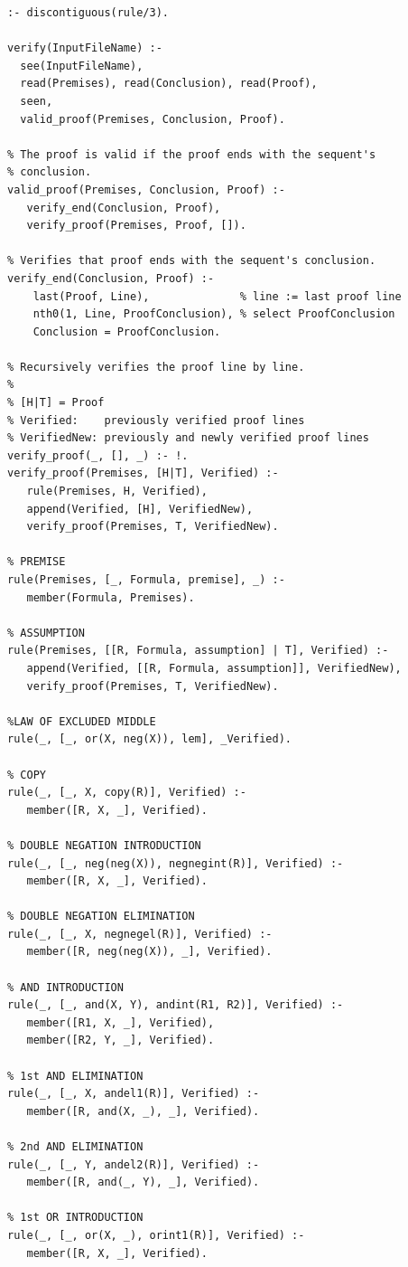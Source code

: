 \documentclass[a4paper, 11pt]{article}
\begin{document}
\begin{lstlisting}
:- discontiguous(rule/3).

verify(InputFileName) :-
  see(InputFileName),
  read(Premises), read(Conclusion), read(Proof),
  seen,
  valid_proof(Premises, Conclusion, Proof).

% The proof is valid if the proof ends with the sequent's
% conclusion.
valid_proof(Premises, Conclusion, Proof) :- 
   verify_end(Conclusion, Proof),
   verify_proof(Premises, Proof, []).

% Verifies that proof ends with the sequent's conclusion.
verify_end(Conclusion, Proof) :-
    last(Proof, Line),              % line := last proof line
    nth0(1, Line, ProofConclusion), % select ProofConclusion
    Conclusion = ProofConclusion.

% Recursively verifies the proof line by line.
%
% [H|T] = Proof
% Verified:    previously verified proof lines
% VerifiedNew: previously and newly verified proof lines
verify_proof(_, [], _) :- !.
verify_proof(Premises, [H|T], Verified) :-
   rule(Premises, H, Verified),
   append(Verified, [H], VerifiedNew),
   verify_proof(Premises, T, VerifiedNew).

% PREMISE
rule(Premises, [_, Formula, premise], _) :-
   member(Formula, Premises).

% ASSUMPTION
rule(Premises, [[R, Formula, assumption] | T], Verified) :-
   append(Verified, [[R, Formula, assumption]], VerifiedNew),
   verify_proof(Premises, T, VerifiedNew).

%LAW OF EXCLUDED MIDDLE
rule(_, [_, or(X, neg(X)), lem], _Verified).

% COPY
rule(_, [_, X, copy(R)], Verified) :-
   member([R, X, _], Verified).

% DOUBLE NEGATION INTRODUCTION
rule(_, [_, neg(neg(X)), negnegint(R)], Verified) :-
   member([R, X, _], Verified).

% DOUBLE NEGATION ELIMINATION
rule(_, [_, X, negnegel(R)], Verified) :-
   member([R, neg(neg(X)), _], Verified).

% AND INTRODUCTION
rule(_, [_, and(X, Y), andint(R1, R2)], Verified) :-
   member([R1, X, _], Verified),
   member([R2, Y, _], Verified).

% 1st AND ELIMINATION
rule(_, [_, X, andel1(R)], Verified) :-
   member([R, and(X, _), _], Verified).

% 2nd AND ELIMINATION
rule(_, [_, Y, andel2(R)], Verified) :-
   member([R, and(_, Y), _], Verified).

% 1st OR INTRODUCTION
rule(_, [_, or(X, _), orint1(R)], Verified) :-
   member([R, X, _], Verified).


\end{lstlisting}
\end{document}
